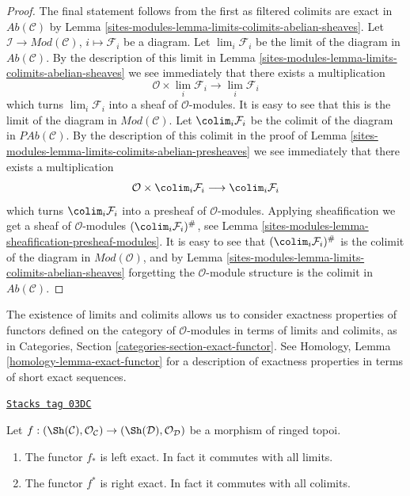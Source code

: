 \begin{proof}
The final statement follows from the first as filtered colimits are
exact in $\textit{Ab}(\mathcal{C})$ by
Lemma \ref{sites-modules-lemma-limits-colimits-abelian-sheaves}.
Let $\mathcal{I} \to \textit{Mod}(\mathcal{C})$, $i \mapsto \mathcal{F}_i$
be a diagram. Let $\lim_i \mathcal{F}_i$ be the limit of the diagram
in $\textit{Ab}(\mathcal{C})$. By the description of this limit in
Lemma \ref{sites-modules-lemma-limits-colimits-abelian-sheaves} we see immediately that
there exists a multiplication
$$
\mathcal{O} \times \lim_i \mathcal{F}_i
\longrightarrow
\lim_i \mathcal{F}_i
$$
which turns $\lim_i \mathcal{F}_i$ into a sheaf of
$\mathcal{O}$-modules. It is easy to see that this is the
limit of the diagram in $\textit{Mod}(\mathcal{C})$. Let
$\colim_i \mathcal{F}_i$ be the colimit of the diagram
in $\textit{PAb}(\mathcal{C})$. By the description of this colimit
in the proof of Lemma \ref{sites-modules-lemma-limits-colimits-abelian-presheaves}
we see immediately that there exists a multiplication
$$
\mathcal{O} \times \colim_i \mathcal{F}_i
\longrightarrow
\colim_i \mathcal{F}_i
$$
which turns $\colim_i \mathcal{F}_i$ into a presheaf of
$\mathcal{O}$-modules. Applying sheafification we get a
sheaf of $\mathcal{O}$-modules $(\colim_i \mathcal{F}_i)^\#$,
see Lemma \ref{sites-modules-lemma-sheafification-presheaf-modules}.
It is easy to see that $(\colim_i \mathcal{F}_i)^\#$
is the colimit of the diagram in $\textit{Mod}(\mathcal{O})$, and
by Lemma \ref{sites-modules-lemma-limits-colimits-abelian-sheaves}
forgetting the $\mathcal{O}$-module structure is
the colimit in $\textit{Ab}(\mathcal{C})$.
\end{proof}

The existence of limits and colimits allows us to consider exactness
properties of functors defined on the category of $\mathcal{O}$-modules
in terms of limits and colimits, as in
Categories, Section \ref{categories-section-exact-functor}.
See Homology, Lemma \ref{homology-lemma-exact-functor} for a description of
exactness properties in terms of short exact sequences.

\begin{lemma}
\label{sites-modules-lemma-exactness-pushforward-pullback}
\href{https://stacks.math.columbia.edu/tag/03DC}{\texttt{Stacks tag 03DC}}

Let $f : (\Sh(\mathcal{C}), \mathcal{O}_\mathcal{C})
\to (\Sh(\mathcal{D}), \mathcal{O}_\mathcal{D})$
be a morphism of ringed topoi.
\begin{enumerate}
\item The functor $f_*$ is left exact. In fact it commutes with
all limits.
\item The functor $f^*$ is right exact. In fact it commutes
with all colimits.
\end{enumerate}
\end{lemma}

